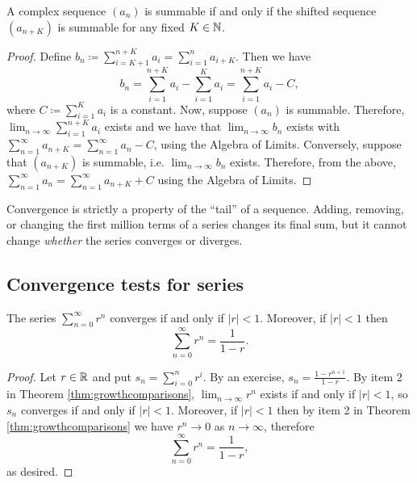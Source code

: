 \documentclass[../analysis1.tex]{subfiles}
\begin{document}
\begin{lemma}
    \begin{shaded*}
        A complex sequence $(a_n)$ is summable if and only if the shifted sequence $(a_{n+K})$ is summable for any fixed $K\in\mathbb{N}$.
    \end{shaded*}
\end{lemma}
\begin{proof}
    Define $b_n\coloneqq \sum_{i=K+1}^{n+K}a_i=\sum_{i=1}^na_{i+K}$. Then we have $$b_n=\sum_{i=1}^{n+K}a_i-\sum_{i=1}^Ka_i=\sum_{i=1}^{n+K}a_i-C,$$where $C\coloneqq \sum_{i=1}^Ka_i$ is a constant. Now, suppose $(a_n)$ is summable.
    Therefore, $\lim_{n\to\infty}\sum_{i=1}^{n+K}a_i$ exists and we have that $\lim_{n\to\infty}b_n$ exists with $\sum_{n=1}^{\infty}a_{n+K}=\sum_{n=1}^\infty a_n -C$, using the Algebra of Limits.
    Conversely, suppose that $(a_{n+K})$ is summable, i.e. $\lim_{n\to\infty} b_n$ exists. Therefore, from the above, $\sum_{n=1}^{\infty}a_n=\sum_{n=1}^{\infty}a_{n+K}+C$ using the Algebra of Limits.\qedhere
\end{proof}

\begin{remark}
    Convergence is strictly a property of the ``tail'' of a sequence. Adding, removing, or changing the first million terms of a series changes its final sum, but it cannot change \textit{whether} the series converges or diverges.
\end{remark}

\subsection{Convergence tests for series}

\begin{theorem}
\label{thm:geoseries}
    \begin{shaded*}
        The series $\sum_{n=0}^{\infty}r^n$ converges if and only if $|r|<1$. Moreover, if $|r|<1$ then $$\sum_{n=0}^{\infty}r^n=\frac{1}{1-r}.$$
    \end{shaded*}
\end{theorem}
\begin{proof}
    Let $r\in\mathbb{R}$ and put $s_n=\sum_{i=0}^nr^i$. By an exercise, $s_n=\frac{1-r^{n+1}}{1-r}$. By item 2 in Theorem \ref{thm:growthcomparisons}, $\lim_{n\to\infty}r^n$ exists if and only if $|r|<1$, so $s_n$ converges if and only if $|r|<1$. Moreover, if $|r|<1$ then by item 2 in Theorem \ref{thm:growthcomparisons} we have $r^n\to 0$ as $n\to\infty$, therefore $$\sum_{n=0}^{\infty}r^n=\frac{1}{1-r},$$as desired.\qedhere
\end{proof}
\end{document}

